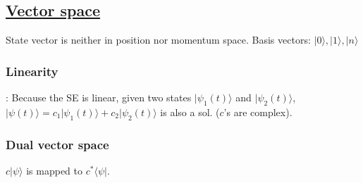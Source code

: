 \subsection{\underline{Vector space}}
State vector is neither in position nor momentum space. Basis vectors: $|0 \rangle, |1 \rangle, |n \rangle$

\subsubsection{Linearity}: Because the SE is linear, given two states $|\psi_1(t) \rangle$ and $|\psi_2(t) \rangle$, $|\psi(t) \rangle = c_1 |\psi_1(t) \rangle + c_2|\psi_2(t)\rangle$ is also a sol. ($c$'s are complex).


\subsubsection{Dual vector space}
$c|\psi \rangle$ is mapped to $c^* \langle \psi |$. 



